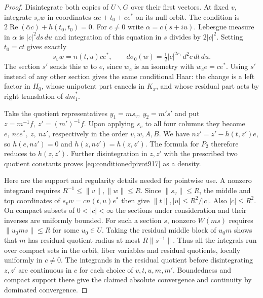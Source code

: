 \documentclass[a4paper,11pt]{article}
\theoremstyle{definition}
\theoremstyle{remark}
\numberwithin{equation}{section}
\begin{document}
\begin{proof}
Disintegrate both copies of \(U\backslash G\) over their first
vectors. At fixed \(v\), integrate \(s_vw\) in coordinates
\(\alpha e+t_0+c e^*\) on its null orbit. The condition is
\(2\operatorname{Re}(\bar\alpha c)+h(t_0,t_0)=0\).
For \(c\ne0\) write \(\alpha=c(s+iu)\).
Lebesgue measure in \(\alpha\) is \(|c|^2ds\,du\) and
integration of this equation in \(s\) divides by \(2|c|^2\).
Setting \(t_0=ct\) gives exactly
\[
 s_vw=n(t,u)c e^*,\qquad
     d\sigma_0(w)=\tfrac12 |c|^{2r_1}\,d^2c\,dt\,du .
\]
The section \(s'\) sends this \(w\) to \(e\), since \(w_c\)
is an isometry with \(w_c e=c e^*\).
Using \(s'\) instead of any other section gives the same
conditional Haar: the change is a left factor in \(H_0\),
whose unipotent part cancels in \(K_x\), and whose residual
part acts by right translation of \(d\dot m_1^*\).

Take the quotient representatives \(y_1=m s_v,\ y_2=m's'\)
and put \(z=m^{-1}f,\ z'=(m')^{-1}f\). Upon applying \(s_v\)
to all four columns they become
\(e,\ n c e^*,\ z,\ n z'\), respectively in the order
\(v,w,A,B\). We have \(nz'=z'-h(t,z')e\), so \(h(e,nz')=0\)
and \(h(z,nz')=h(z,z')\). The formula for \(P_2\) therefore
reduces to \(h(z,z')\). Further disintegration in \(z,z'\)
with the prescribed two quotient constants proves
\eqref{eq:conditionedpivot917} as a density.

Here are the support and regularity details needed for pointwise
use. A nonzero integrand requires \(R^{-1}\le\|v\|,\|w\|\le R\).
Since \(\|s_v\|\le R\), the middle and top coordinates of
\(s_vw=c n(t,u)e^*\) then give
\(\|t\|,|u|\le R^2/|c|\). Also \(|c|\le R^2\).
On compact subsets of \(0<|c|<\infty\) the sections under
consideration and their inverses are uniformly bounded.
For such a section \(s\), nonzero \(W(ms)\) requires
\(\|u_0 m s\|\le R\) for some \(u_0\in U\). Taking the
residual middle block of \(u_0m\) shows that \(m\) has
residual quotient radius at most \(R\|s^{-1}\|\).
Thus all the integrals run over compact sets in the orbit,
fiber variables and residual quotients, locally uniformly in
\(c\ne0\). The integrands in the residual quotient before
disintegrating \(z,z'\) are continuous in \(c\) for each
choice of \(v,t,u,m,m'\). Boundedness and compact support
there give the claimed absolute convergence and continuity
by dominated convergence.


\end{proof}
\end{document}
